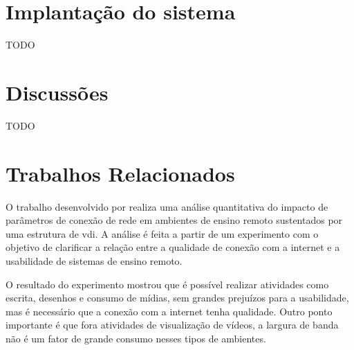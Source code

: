  
    
     

\section{Implantação do sistema}\label{sec:implantacaoSistema}

TODO

\section{Discussões}\label{sec:discussoes} 

TODO



\section{Trabalhos Relacionados}
\label{sec:trabalhosRelacionados}

O trabalho desenvolvido por \citet{qoselearning} realiza uma análise quantitativa do impacto de
parâmetros de conexão de rede em ambientes de ensino remoto sustentados por uma estrutura de \gls{vdi}.
A análise é feita a partir de um experimento com o objetivo de clarificar a relação entre a qualidade de
conexão com a internet e a usabilidade de sistemas de ensino remoto.

O resultado do experimento mostrou que é possível realizar atividades como escrita, desenhos e
consumo de mídias, sem grandes prejuízos para a usabilidade, mas é necessário que a conexão com a
internet tenha qualidade. Outro ponto importante é que fora atividades de visualização de vídeos, a
largura de banda não é um fator de grande consumo nesses tipos de ambientes.

